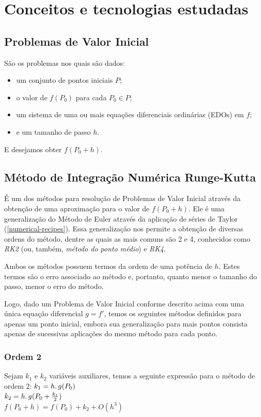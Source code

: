 \chapter{Conceitos e tecnologias estudadas}

\section{Problemas de Valor Inicial}
São os problemas nos quais são dados:
\begin{itemize}
  \item um conjunto de pontos iniciais $P$;
  \item o valor de $f(P_{0})$ para cada $P_{0} \in P$;
  \item um sistema de uma ou mais equações diferenciais ordinárias (EDOs) em $f$;
  \item e um tamanho de passo $h$.
\end{itemize}

E desejamos obter $f(P_{0} + h)$.

\section{Método de Integração Numérica Runge-Kutta}\label{rungekutta}
É um dos métodos para resolução de Problemas de Valor Inicial através da obtenção de uma aproximação para o valor de $f(P_{0} + h)$. Ele é uma generalização do Método de Euler através da aplicação de séries de Taylor (\ref{numerical-recipes}). Essa generalização nos permite a obtenção de diversas ordens do método, dentre as quais as mais comuns são 2 e 4, conhecidos como \textit{RK2} (ou, também, \textit{método do ponto médio}) e \textit{RK4}.

Ambos os métodos possuem termos da ordem de uma potência de $h$. Estes termos são o erro associado ao método e, portanto, quanto menor o tamanho do passo, menor o erro do método.

Logo, dado um Problema de Valor Inicial conforme descrito acima com uma única equação diferencial $g = f'$, temos os seguintes métodos definidos para apenas um ponto inicial, embora sua generalização para mais pontos consista apenas de sucessivas aplicações do mesmo método para cada ponto.

  \newpage
  \subsection{Ordem 2}
  Sejam $k_{1}$ e $k_{2}$ variáveis auxiliares, temos a seguinte expressão para o método de ordem 2:
  \newline
  \newline
  $k_{1} = h\ldotp g(P_{0})$\\
  $k_{2} = h\ldotp g(P_{0} + \frac{k_{1}}{2})$\\
  $f(P_{0} + h) = f(P_{0}) + k_{2} + O(h^{3})$
  
